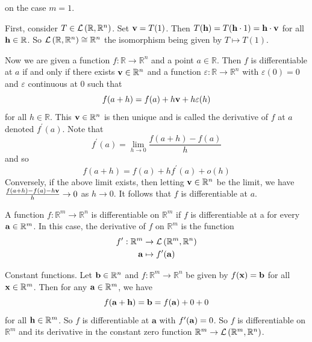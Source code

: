 \documentclass[a4paper,11pt]{article}
\begin{document}
\begin{remark}
    on the case $m=1$.

First, consider $T \in {\mathcal{L}}\left(\mathbb{R}, \mathbb{R}^{n}\right)$. Set ${\bf v}=T(1)$. Then $T({\bf h})=T({\bf h} \cdot 1)={\bf h} \cdot {\bf v}$ for all ${\bf h} \in \mathbb{R}$. So ${\mathcal{L}}\left(\mathbb{R}, \mathbb{R}^{n}\right) \cong \mathbb{R}^{n}$ the isomorphism being given by $T \mapsto T(1)$.

Now we are given a function $f: \mathbb{R} \rightarrow \mathbb{R}^{n}$ and a point $a \in \mathbb{R}$. Then $f$ is differentiable at $a$ if and only if there exists ${\bf v} \in \mathbb{R}^{n}$ and a function $\varepsilon: \mathbb{R} \rightarrow \mathbb{R}^{n}$ with $\varepsilon(0)=0$ and $\varepsilon$ continuous at 0 such that
$$
f(a+h)=f(a)+h {\bf v}+h \varepsilon(h)
$$
for all $h \in \mathbb{R}$. This ${\bf v} \in \mathbb{R}^{n}$ is then unique and is called the derivative of $f$ at $a$ denoted $f^{\prime}(a)$. Note that
$$
f^{\prime}(a)=\lim _{h \rightarrow 0} \frac{f(a+h)-f(a)}{h}
$$
and so
$$
f(a+h)=f(a)+h f^{\prime}(a)+o(h)
$$
Conversely, if the above limit exists, then letting ${\bf v} \in \mathbb{R}^{n}$ be the limit, we have $\frac{f(a+h)-f(a)-h {\bf v}}{h} \rightarrow 0$ as $h \rightarrow 0$. It follows that $f$ is differentiable at $a$.
\end{remark}

\begin{definition}
    A function $f: \mathbb{R}^{m} \rightarrow \mathbb{R}^{n}$ is differentiable on $\mathbb{R}^{m}$ if $f$ is differentiable at a for every ${\bf a} \in \mathbb{R}^{m}$. In this case, the derivative of $f$ on $\mathbb{R}^{m}$ is the function
$$
\begin{aligned}
f^{\prime}: \mathbb{R}^{m} & \rightarrow {\mathcal{L}}\left(\mathbb{R}^{m}, \mathbb{R}^{n}\right) \\
{\bf a} & \mapsto f^{\prime}({\bf a})
\end{aligned}
$$
\end{definition}

\begin{example}
    Constant functions. Let ${\bf b} \in \mathbb{R}^{n}$ and $f: \mathbb{R}^{m} \rightarrow \mathbb{R}^{n}$ be given by $f({\bf x})={\bf b}$ for all ${\bf x} \in \mathbb{R}^{m}$. Then for any ${\bf a} \in \mathbb{R}^{m}$, we have
$$
f({\bf a}+{\bf h})={\bf b}=f({\bf a})+0+0
$$
for all ${\bf h} \in \mathbb{R}^{m}$. So $f$ is differentiable at $\mathbf{a}$ with $f^{\prime}({\bf a})=0$. So $f$ is differentiable on $\mathbb{R}^{m}$ and its derivative in the constant zero function $\mathbb{R}^{m} \rightarrow {\mathcal{L}}\left(\mathbb{R}^{m}, \mathbb{R}^{n}\right)$.
\end{example}
\end{document}
